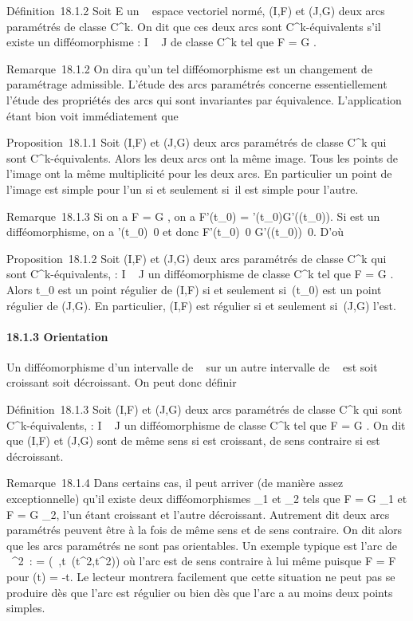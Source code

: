\documentclass[]{article}
\begin{document}
Définition~18.1.2 Soit E un ~ espace vectoriel normé, (I,F) et (J,G)
deux arcs paramétrés de classe C^k. On dit que ces deux arcs
sont C^k-équivalents s'il existe un difféomorphisme \theta : I \rightarrow~ J
de classe C^k tel que F = G \cdot \theta.

Remarque~18.1.2 On dira qu'un tel difféomorphisme est un changement de
paramétrage admissible. L'étude des arcs paramétrés concerne
essentiellement l'étude des propriétés des arcs qui sont invariantes par
équivalence. L'application \theta étant bi\jmathective on voit immédiatement que

Proposition~18.1.1 Soit (I,F) et (J,G) deux arcs paramétrés de classe
C^k qui sont C^k-équivalents. Alors les deux arcs
ont la même image. Tous les points de l'image ont la même multiplicité
pour les deux arcs. En particulier un point de l'image est simple pour
l'un si et seulement si~il est simple pour l'autre.

Remarque~18.1.3 Si on a F = G \cdot \theta, on a F'(t\_0) =
\theta'(t\_0)G'(\theta(t\_0)). Si \theta est un difféomorphisme, on a
\theta'(t\_0)\neq~0 et donc
F'(t\_0)\neq~0
\Leftrightarrow
G'(\theta(t\_0))\neq~0. D'où

Proposition~18.1.2 Soit (I,F) et (J,G) deux arcs paramétrés de classe
C^k qui sont C^k-équivalents, \theta : I \rightarrow~ J un
difféomorphisme de classe C^k tel que F = G \cdot \theta. Alors
t\_0 est un point régulier de (I,F) si et seulement
si~\theta(t\_0) est un point régulier de (J,G). En particulier, (I,F)
est régulier si et seulement si~(J,G) l'est.

\paragraph{18.1.3 Orientation}

Un difféomorphisme d'un intervalle de ~ sur un autre intervalle de ~ est
soit croissant soit décroissant. On peut donc définir

Définition~18.1.3 Soit (I,F) et (J,G) deux arcs paramétrés de classe
C^k qui sont C^k-équivalents, \theta : I \rightarrow~ J un
difféomorphisme de classe C^k tel que F = G \cdot \theta. On dit que
(I,F) et (J,G) sont de même sens si \theta est croissant, de sens contraire
si \theta est décroissant.

Remarque~18.1.4 Dans certains cas, il peut arriver (de manière assez
exceptionnelle) qu'il existe deux difféomorphismes \theta\_1 et
\theta\_2 tels que F = G \cdot \theta\_1 et F = G \cdot \theta\_2, l'un
étant croissant et l'autre décroissant. Autrement dit deux arcs
paramétrés peuvent être à la fois de même sens et de sens contraire. On
dit alors que les arcs paramétrés ne sont pas orientables. Un exemple
typique est l'arc de ~^2~: \Gamma =
(~,t\mapsto~(t^2,t^2)) où
l'arc est de sens contraire à lui même puisque F \cdot \theta = F pour \theta(t) = -t.
Le lecteur montrera facilement que cette situation ne peut pas se
produire dès que l'arc est régulier ou bien dès que l'arc a au moins
deux points simples.
\end{document}
